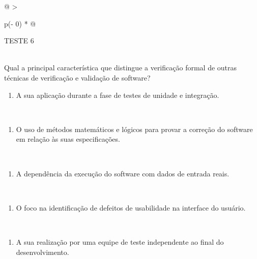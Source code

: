 \documentclass[
]{book}
\providecommand{\tightlist}{%
  \setlength{\itemsep}{0pt}\setlength{\parskip}{0pt}}
\begin{document}
\begin{longtable}[]{@{}
  >{\raggedright\arraybackslash}p{(\columnwidth - 0\tabcolsep) * }@{}}
\toprule\noalign{}
\begin{minipage}[b]{\linewidth}\raggedright
TESTE 6
\end{minipage} \\
\midrule\noalign{}
\endhead
\bottomrule\noalign{}
\endlastfoot
Qual a principal característica que distingue a verificação formal de outras técnicas de verificação e validação de software? \\
\begin{minipage}[t]{\linewidth}\raggedright
\begin{enumerate}
\def\labelenumi{\Alph{enumi})}
\tightlist
\item
  A sua aplicação durante a fase de testes de unidade e integração.
\end{enumerate}
\end{minipage} \\
\begin{minipage}[t]{\linewidth}\raggedright
\begin{enumerate}
\def\labelenumi{\Alph{enumi})}
\setcounter{enumi}{1}
\tightlist
\item
  O uso de métodos matemáticos e lógicos para provar a correção do software em relação às suas especificações.
\end{enumerate}
\end{minipage} \\
\begin{minipage}[t]{\linewidth}\raggedright
\begin{enumerate}
\def\labelenumi{\Alph{enumi})}
\setcounter{enumi}{2}
\tightlist
\item
  A dependência da execução do software com dados de entrada reais.
\end{enumerate}
\end{minipage} \\
\begin{minipage}[t]{\linewidth}\raggedright
\begin{enumerate}
\def\labelenumi{\Alph{enumi})}
\setcounter{enumi}{3}
\tightlist
\item
  O foco na identificação de defeitos de usabilidade na interface do usuário.
\end{enumerate}
\end{minipage} \\
\begin{minipage}[t]{\linewidth}\raggedright
\begin{enumerate}
\def\labelenumi{\Alph{enumi})}
\setcounter{enumi}{4}
\tightlist
\item
  A sua realização por uma equipe de teste independente ao final do desenvolvimento.
\end{enumerate}
\end{minipage} \\
\end{longtable}
\end{document}
